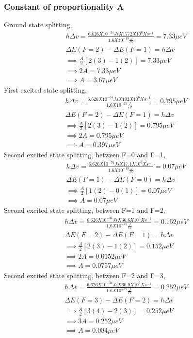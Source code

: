 \documentclass[11pt, a4paper]{article}
\begin{document}
\subsubsection*{Constant of proportionality A}
Ground state splitting,  
\begin{gather}
    h\Delta v = \frac{6.626X10^{-34}JsX 1772X10^{6}Xs^{-1}}{1.6X10^{-19}\frac{J}{eV}} = 7.33 \mu eV\\
    \Delta E(F=2) - \Delta E(F=1) = h\Delta v \\
    \implies \frac{A}{2}[2(3)-1(2)] = 7.33 \mu eV \\
    \implies 2A = 7.33 \mu eV\\
    \implies A = 3.67 \mu eV
\end{gather}
First excited state splitting,
\begin{gather}
    h\Delta v = \frac{6.626X10^{-34}JsX 192X10^{6}Xs^{-1}}{1.6X10^{-19}\frac{J}{eV}} = 0.795 \mu eV\\
    \Delta E(F=2) - \Delta E(F=1) = h\Delta v \\
    \implies \frac{A}{2}[2(3)-1(2)] = 0.795 \mu eV \\
    \implies 2A = 0.795 \mu eV\\
    \implies A = 0.397 \mu eV
\end{gather}
Second excited state splitting, between F=0 and F=1, 
\begin{gather}
    h\Delta v = \frac{6.626X10^{-34}JsX 17.1X10^{6}Xs^{-1}}{1.6X10^{-19}\frac{J}{eV}} = 0.07 \mu eV\\
    \Delta E(F=1) - \Delta E(F=0) = h\Delta v \\
    \implies \frac{A}{2}[1(2)-0(1)] = 0.07 \mu eV \\
    \implies A = 0.07 \mu eV
\end{gather}
Second excited state splitting, between F=1 and F=2,
\begin{gather}
    h\Delta v = \frac{6.626X10^{-34}JsX 36.6X10^{6}Xs^{-1}}{1.6X10^{-19}\frac{J}{eV}} = 0.152 \mu eV\\
    \Delta E(F=2) - \Delta E(F=1) = h\Delta v \\
    \implies \frac{A}{2}[2(3)-1(2)] = 0.152 \mu eV \\
    \implies 2A = 0.0152 \mu eV\\
    \implies A = 0.0757 \mu eV
\end{gather}
Second excited state splitting, between F=2 and F=3,
\begin{gather}
    h\Delta v = \frac{6.626X10^{-34}JsX 60.9X10^{6}Xs^{-1}}{1.6X10^{-19}\frac{J}{eV}} = 0.252 \mu eV\\
    \Delta E(F=3) - \Delta E(F=2) = h\Delta v \\
    \implies \frac{A}{2}[3(4)-2(3)] = 0.252 \mu eV \\
    \implies 3A = 0.252 \mu eV\\
    \implies A = 0.084 \mu eV
\end{gather}
\end{document}
